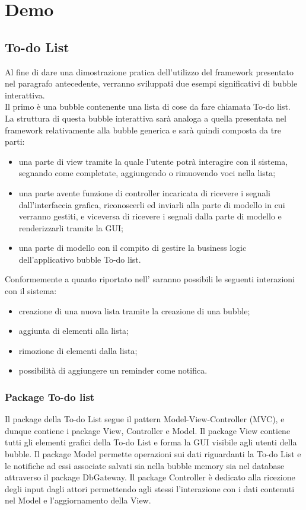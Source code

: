 \section{Demo}

\subsection{To-do List}
Al fine di dare una dimostrazione pratica dell'utilizzo del framework presentato nel paragrafo antecedente, verranno sviluppati due esempi significativi di bubble interattiva.\\
Il primo è una bubble contenente una lista di cose da fare chiamata To-do list.\\
La struttura di questa bubble interattiva sarà analoga a quella presentata nel framework relativamente alla bubble generica e sarà quindi composta da tre parti:
\begin{itemize}
	\item una parte di view tramite la quale l'utente potrà interagire con il sistema, segnando come completate, aggiungendo o rimuovendo voci nella lista;
	\item una parte avente funzione di controller incaricata di ricevere i segnali dall'interfaccia grafica, riconoscerli ed inviarli alla parte di modello in cui verranno gestiti, e viceversa di ricevere i segnali dalla parte di modello e renderizzarli tramite la GUI;
	\item una parte di modello con il compito di gestire la business logic dell'applicativo bubble To-do list.
\end{itemize}
Conformemente a quanto riportato nell'\AnalisiDeiRequisiti{} saranno possibili le seguenti interazioni con il sistema:
\begin{itemize}
	\item creazione di una nuova lista tramite la creazione di una bubble;
	\item aggiunta di elementi alla lista;
	\item rimozione di elementi dalla lista;
	\item possibilità di aggiungere un reminder come notifica.
\end{itemize}

\subsubsection{Package To-do list}

Il package della To-do List segue il pattern Model-View-Controller (MVC), e dunque contiene i package View, Controller e Model. Il package View contiene tutti gli elementi grafici della To-do List e forma la GUI visibile agli utenti della bubble. Il package Model permette operazioni sui dati riguardanti la To-do List e le notifiche ad essi associate salvati sia nella bubble memory sia nel database attraverso il package Db\-Gateway. Il package Controller è dedicato alla ricezione degli input dagli attori permettendo agli stessi l'interazione con i dati contenuti nel Model e l'aggiornamento della View.

